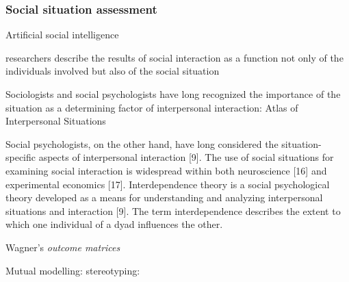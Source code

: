 \subsubsection{Social situation assessment}

Artificial social intelligence~\cite{bainbridge1994artificial}

researchers describe the results of social
interaction as a function not only of the individuals involved
but also of the social situation~\cite{rusbult2003interdependence}

Sociologists and social psychologists have long
recognized the importance of the situation as a determining
factor of interpersonal interaction: Atlas of Interpersonal Situations~\cite{kelley2003atlas}

Social psychologists, on the other hand, have long
considered the situation-specific aspects of interpersonal
interaction [9]. The use of social situations for examining
social interaction is widespread within both neuroscience [16]
and experimental economics [17]. Interdependence theory is a
social psychological theory developed as a means for
understanding and analyzing interpersonal situations and
interaction [9]. The term interdependence describes the extent
to which one individual of a dyad influences the other.



Wagner's \emph{outcome matrices}
\cite{wagner2006framework} \cite{wagner2009creating}

Mutual modelling:
\cite{dillenbourg2016symmetry}
stereotyping: \cite{wagner2015robots}


